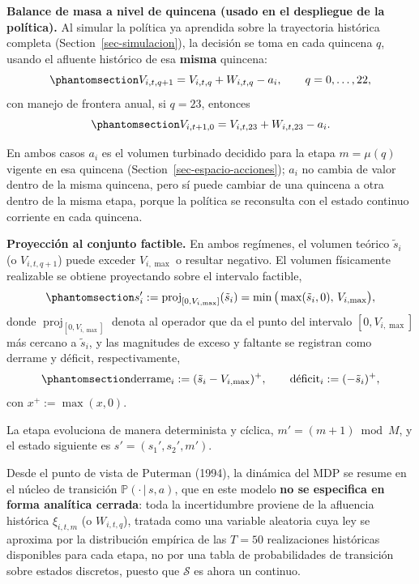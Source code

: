 \documentclass[
  letterpaper,
  DIV=11,
  numbers=noendperiod]{scrreprt}
\theoremstyle{definition}
\theoremstyle{remark}
\begin{document}
\textbf{Balance de masa a nivel de quincena (usado en el despliegue de
la política).} Al simular la política ya aprendida sobre la trayectoria
histórica completa (Section~\ref{sec-simulacion}), la decisión se toma
en cada quincena \(q\), usando el afluente histórico de esa
\textbf{misma} quincena:
\begin{equation}\protect\phantomsection\label{eq-transicion-quincenal}{
V_{i,t,q+1} = V_{i,t,q} + W_{i,t,q} - a_i, \qquad q=0,\dots,22,
}\end{equation} con manejo de frontera anual, si \(q=23\), entonces\\
\begin{equation}\protect\phantomsection\label{eq-transicion23}{
V_{i,t+1,0} = V_{i,t,23} + W_{i,t,23} - a_i.
}\end{equation}

En ambos casos \(a_i\) es el volumen turbinado decidido para la etapa
\(m=\mu(q)\) vigente en esa quincena
(Section~\ref{sec-espacio-acciones}); \(a_i\) no cambia de valor dentro
de la misma quincena, pero sí puede cambiar de una quincena a otra
dentro de la misma etapa, porque la política se reconsulta con el estado
continuo corriente en cada quincena.

\textbf{Proyección al conjunto factible.} En ambos regímenes, el volumen
teórico \(\tilde s_i\) (o \(V_{i,t,q+1}\)) puede exceder \(V_{i,\max}\)
o resultar negativo. El volumen físicamente realizable se obtiene
proyectando sobre el intervalo factible,
\begin{equation}\protect\phantomsection\label{eq-proyeccion}{
s_i' := \operatorname{proj}_{[0,V_{i,\max}]}(\tilde s_i) = \min\big(\max(\tilde s_i,0),\,V_{i,\max}\big),
}\end{equation} donde \(\operatorname{proj}_{[0,V_{i,\max}]}\) denota al
operador que da el punto del intervalo \([0,V_{i,\max}]\) más cercano a
\(\tilde s_i\), y las magnitudes de exceso y faltante se registran como
derrame y déficit, respectivamente,
\begin{equation}\protect\phantomsection\label{eq-derrame-deficit}{
\text{derrame}_i := (\tilde s_i - V_{i,\max})^+, \qquad \text{déficit}_i := (-\tilde s_i)^+,
}\end{equation} con \(x^+:=\max(x,0)\).

La etapa evoluciona de manera determinista y cíclica,
\(m'=(m+1)\bmod M\), y el estado siguiente es \(s'=(s_1',s_2',m')\).

Desde el punto de vista de Puterman (1994), la dinámica del MDP se
resume en el núcleo de transición \(\mathbb P(\cdot\,|\,s,a)\), que en
este modelo \textbf{no se especifica en forma analítica cerrada}: toda
la incertidumbre proviene de la afluencia histórica \(\xi_{i,t,m}\) (o
\(W_{i,t,q}\)), tratada como una variable aleatoria cuya ley se aproxima
por la distribución empírica de las \(T=50\) realizaciones históricas
disponibles para cada etapa, no por una tabla de probabilidades de
transición sobre estados discretos, puesto que \(\mathcal S\) es ahora
un continuo.
\end{document}
